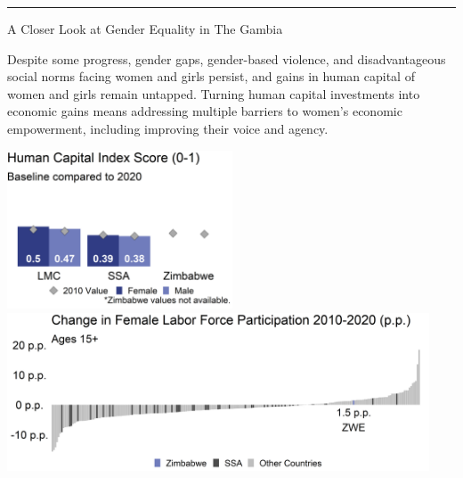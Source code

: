 \documentclass[
]{article}
\begin{document}
\vspace{.3cm}

\centering\rule{19.5cm}{0.5pt}

\vspace{.3cm}

\begin{minipage}[c][1.65cm][t]{19.5cm}
\begin{minipage}[c][1.65cm][t]{6cm}
\begin{spacing}{2}\fontsize{14}{1}\selectfont   
A Closer Look at Gender Equality in The Gambia
\normalsize
\end{spacing}\end{minipage}\hspace{0.5cm}
\begin{minipage}[c][1.65cm][t]{12.75cm}
\fontsize{9}{8}\selectfont   
Despite some progress, gender gaps, gender-based violence, and disadvantageous social norms facing women and girls persist, and gains in human capital of women and girls remain untapped. Turning human capital investments into economic gains means addressing multiple barriers to women’s economic empowerment, including improving their voice and agency.
\normalsize
\end{minipage}
\end{minipage}

\vspace{.15cm}

\begin{minipage}[t][4.7cm][t]{19.5cm}
\href{https://genderdata.worldbank.org/indicators/hd-hci-ovrl}{\includegraphics[height=4.7cm]{HCIplot.png}}\hspace{.2cm}
\href{https://genderdata.worldbank.org/indicators/sl-tlf-acti-zs/}{\includegraphics[height=4.7cm]{LFPplot.png}}  
\end{minipage}
\end{document}
